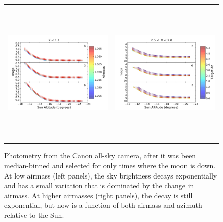 \documentclass[]{spie}
\begin{document}
\begin{figure}[ht]
  \begin{center}
  \begin{tabular}{c c}
  \includegraphics[height=7cm]{plots/altDecay.pdf} & \includegraphics[height=7cm]{plots/altDecayHA.pdf}
  \end{tabular}
  \end{center}
  \caption{Photometry from the Canon all-sky camera, after it was been median-binned and selected for only times where the moon is down.  At low airmass (left panels), the sky brightness decays exponentially and has a small variation that is dominated by the change in airmass.  At higher airmasses (right panels), the decay is still exponential, but now is a function of both airmass and azimuth relative to the Sun. \label{fig:twiExp}}
\end{figure}
\end{document}
